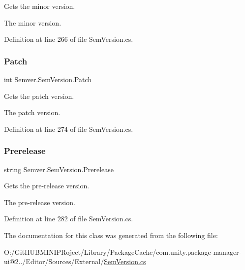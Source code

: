 Gets the minor version. 

The minor version. 

Definition at line 266 of file Sem\+Version.\+cs.

\mbox{\label{class_semver_1_1_sem_version_a03f77dd74e47eefff519ba00cd43db9a}} 
\subsubsection{\texorpdfstring{Patch}{Patch}}
{\footnotesize\ttfamily int Semver.\+Sem\+Version.\+Patch\hspace{0.3cm}{\ttfamily [get]}}



Gets the patch version. 

The patch version. 

Definition at line 274 of file Sem\+Version.\+cs.

\mbox{\label{class_semver_1_1_sem_version_a8bb1554a68d74cef681af7cc01d460ef}} 
\subsubsection{\texorpdfstring{Prerelease}{Prerelease}}
{\footnotesize\ttfamily string Semver.\+Sem\+Version.\+Prerelease\hspace{0.3cm}{\ttfamily [get]}}



Gets the pre-\/release version. 

The pre-\/release version. 

Definition at line 282 of file Sem\+Version.\+cs.



The documentation for this class was generated from the following file\+:\begin{DoxyCompactItemize}
\item 
O\+:/\+Git\+H\+U\+B\+M\+I\+N\+I\+P\+Roject/\+Library/\+Package\+Cache/com.\+unity.\+package-\/manager-\/ui@2../\+Editor/\+Sources/\+External/\mbox{\hyperlink{_sem_version_8cs}{Sem\+Version.\+cs}}\end{DoxyCompactItemize}
